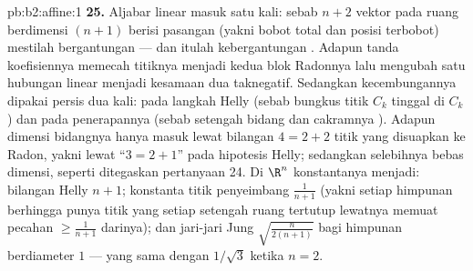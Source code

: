 \begin{solution}{pb:b2:affine:1}
\textbf{25.} Aljabar linear masuk satu kali: sebab $n + 2$ vektor pada
ruang berdimensi $(n+1)$ berisi pasangan (yakni bobot total dan
posisi terbobot) mestilah bergantungan --- dan itulah kebergantungan
. Adapun tanda koefisiennya memecah titiknya
menjadi kedua blok Radonnya lalu mengubah satu hubungan linear menjadi
kesamaan dua  taknegatif. Sedangkan kecembungannya dipakai
persis dua kali: pada langkah Helly (sebab bungkus titik $C_k$
tinggal di $C_k$) dan pada penerapannya (sebab setengah bidang dan
cakramnya ). Adapun dimensi bidangnya hanya masuk
lewat bilangan $4 = 2 + 2$ titik yang disuapkan ke Radon, yakni
lewat ``$3 = 2 + 1$'' pada hipotesis Helly; sedangkan selebihnya
bebas dimensi, seperti ditegaskan pertanyaan 24. Di $\R^n$
konstantanya menjadi: bilangan Helly $n + 1$; konstanta titik penyeimbang
$\frac1{n+1}$ (yakni setiap himpunan berhingga punya titik yang setiap setengah
ruang tertutup lewatnya memuat pecahan $\geq
\frac1{n+1}$ darinya); dan jari-jari Jung
$\sqrt{\frac{n}{2(n+1)}}$ bagi himpunan berdiameter $1$ --- yang sama
dengan $1/\sqrt3$ ketika $n = 2$.

\end{solution}
